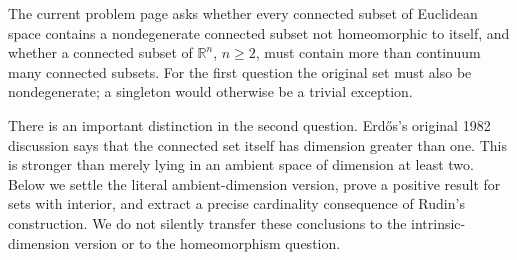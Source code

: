 The current problem page asks whether every connected subset of Euclidean space contains a nondegenerate connected subset not homeomorphic to itself, and whether a connected subset of \(\mathbb R^n\), \(n\geq2\), must contain more than continuum many connected subsets.
For the first question the original set must also be nondegenerate; a singleton would otherwise be a trivial exception.

There is an important distinction in the second question. Erd\H{o}s's original 1982 discussion says that the connected set itself has dimension greater than one. This is stronger than merely lying in an ambient space of dimension at least two.
Below we settle the literal ambient-dimension version, prove a positive result for sets with interior, and extract a precise cardinality consequence of Rudin's construction. We do not silently transfer these conclusions to the intrinsic-dimension version or to the homeomorphism question.
